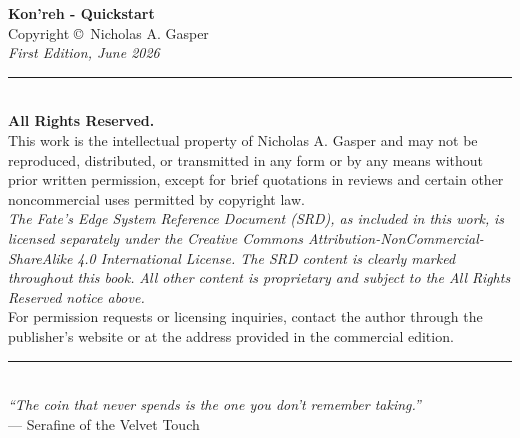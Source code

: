 \cleardoublepage
\thispagestyle{empty}
\begin{center}
  \vspace*{2in}
  {\LARGE\textbf{Kon'reh - Quickstart}}\\[0.3in]
  Copyright \copyright\ Nicholas A. Gasper\\[0.2in]
  \textit{First Edition, June 2026}\\[0.2in]

  \rule{0.6\textwidth}{0.4pt}\\[0.3in]

  \textbf{All Rights Reserved.}\\[0.1in]
  This work is the intellectual property of Nicholas A. Gasper and may not be reproduced,
  distributed, or transmitted in any form or by any means without prior written permission,
  except for brief quotations in reviews and certain other noncommercial uses permitted
  by copyright law.\\[0.2in]

  \textit{The Fate's Edge System Reference Document (SRD), as included in this work,}
  \textit{is licensed separately under the Creative Commons Attribution-NonCommercial-ShareAlike}
  \textit{4.0 International License. The SRD content is clearly marked throughout this book.}
  \textit{All other content is proprietary and subject to the All Rights Reserved notice above.}\\[0.2in]

  For permission requests or licensing inquiries, contact the author through the
  publisher's website or at the address provided in the commercial edition.\\[0.3in]

  \rule{0.5\textwidth}{0.4pt}\\[0.2in]
  \textit{``The coin that never spends is the one you don't remember taking.''}\\[0.1in]
  --- Serafine of the Velvet Touch
\end{center}
\newpage
\cleardoublepage
\thispagestyle{empty}
